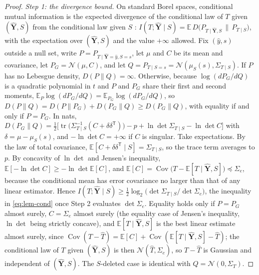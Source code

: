 \documentclass[11pt,onecolumn]{IEEEtran}
\newcommand{\E}{\mathbb{E}}
\newcommand{\tr}{\operatorname{tr}}
\newcommand{\Cov}{\operatorname{Cov}}
\begin{document}
\begin{proof}


\emph{Step 1: the divergence bound.} On standard Borel spaces,
conditional mutual information is the expected divergence of the
conditional law of $T$ given $(\hat{\mathbf Y},S)$ from the conditional
law given $S$ \cite{wyner1978,pinsker1964}:
$I(T;\hat{\mathbf Y}\mid S)=\E\,D\bigl(P_{T\mid\hat{\mathbf Y},S}\,\big\|\,
P_{T\mid S}\bigr)$, with the expectation over $(\hat{\mathbf Y},S)$ and
the value $+\infty$ allowed. Fix $(\hat y,s)$ outside a null set, write
$P=P_{T\mid\hat{\mathbf Y}=\hat y,S=s}$, let $\mu$ and $C$ be its mean
and covariance, let $P_G=\mathcal N(\mu,C)$, and let
$Q=P_{T\mid S=s}=\mathcal N(\mu_S(s),\Sigma_{T\mid S})$. If $P$ has no
Lebesgue density, $D(P\|Q)=\infty$. Otherwise, because
$\log(dP_G/dQ)$ is a quadratic polynomial in $t$ and $P$ and $P_G$ share
their first and second moments, $\E_P\log(dP_G/dQ)=\E_{P_G}\log(dP_G/dQ)$,
so $D(P\|Q)=D(P\|P_G)+D(P_G\|Q)\ge D(P_G\|Q)$, with equality if and only
if $P=P_G$. In nats,
$D(P_G\|Q)=\tfrac12\bigl[\tr\bigl(\Sigma_{T\mid S}^{-1}(C+\delta\delta^{\mathsf T})\bigr)
-p+\ln\det\Sigma_{T\mid S}-\ln\det C\bigr]$ with $\delta=\mu-\mu_S(s)$,
and $-\ln\det C=+\infty$ if $C$ is singular. Take expectations. By the
law of total covariance, $\E[C+\delta\delta^{\mathsf T}\mid S]=\Sigma_{T\mid S}$,
so the trace term averages to $p$. By concavity of $\ln\det$ and
Jensen's inequality, $\E[-\ln\det C]\ge-\ln\det\E[C]$, and
$\E[C]=\Cov\bigl(T-\E[T\mid\hat{\mathbf Y},S]\bigr)\preceq\Sigma_e$,
because the conditional mean has error covariance no larger than that of
any linear estimator. Hence
$I(T;\hat{\mathbf Y}\mid S)\ge\tfrac12\log_2\bigl(\det\Sigma_{T\mid S}/\det\Sigma_e\bigr)$,
the inequality in \eqref{eq:lem-cond} once Step 2 evaluates
$\det\Sigma_e$. Equality holds only if $P=P_G$ almost surely, $C=\Sigma_e$
almost surely (the equality case of Jensen's inequality, $\ln\det$ being
strictly concave), and $\E[T\mid\hat{\mathbf Y},S]$ is the best linear
estimate almost surely, since $\Cov(T-\widehat T)=\E[C]+
\Cov(\E[T\mid\hat{\mathbf Y},S]-\widehat T)$; the conditional law of $T$
given $(\hat{\mathbf Y},S)$ is then $\mathcal N(\widehat T,\Sigma_e)$, so
$T-\widehat T$ is Gaussian and independent of $(\hat{\mathbf Y},S)$. The
$S$-deleted case is identical with $Q=\mathcal N(0,\Sigma_T)$.


\end{proof}
\end{document}
